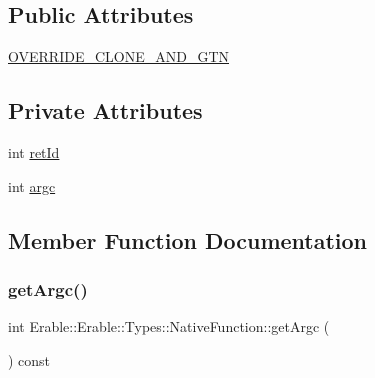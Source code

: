 \subsection*{Public Attributes}
\begin{DoxyCompactItemize}
\item 
\mbox{\hyperlink{class_erable_1_1_erable_1_1_types_1_1_native_function_a0c30ae2ebd66f37e0c73e3ecb6cf8260}{O\+V\+E\+R\+R\+I\+D\+E\+\_\+\+C\+L\+O\+N\+E\+\_\+\+A\+N\+D\+\_\+\+G\+TN}}
\end{DoxyCompactItemize}
\subsection*{Private Attributes}
\begin{DoxyCompactItemize}
\item 
int \mbox{\hyperlink{class_erable_1_1_erable_1_1_types_1_1_native_function_ad5f6d7c2844c638734c962b19668e859}{ret\+Id}}
\item 
int \mbox{\hyperlink{class_erable_1_1_erable_1_1_types_1_1_native_function_a659837466841d70c21d19c634803ead1}{argc}}
\end{DoxyCompactItemize}


\subsection{Member Function Documentation}
\mbox{\label{class_erable_1_1_erable_1_1_types_1_1_native_function_a53c94df1a7e39bbba52119fdab1c9db0}} 
\subsubsection{\texorpdfstring{getArgc()}{getArgc()}}
{\footnotesize\ttfamily int Erable\+::\+Erable\+::\+Types\+::\+Native\+Function\+::get\+Argc (\begin{DoxyParamCaption}{ }\end{DoxyParamCaption}) const\hspace{0.3cm}{\ttfamily [inline]}}

\mbox{\label{class_erable_1_1_erable_1_1_types_1_1_native_function_abfeefff4c94e828d2723f4cb584644f6}} 
